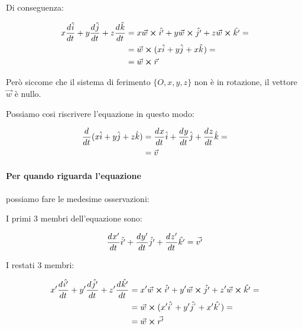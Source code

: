 Di conseguenza:

\begin{equation}
  \begin{split}
    x\der{\uvec{i}}{t} + y\der{\uvec{j}}{t} + z\der{\uvec{k}}{t}
    & = x \vec{w} \crossproduct \uvec{i'} +
    y \vec{w} \crossproduct \uvec{j'} +
    z \vec{w} \crossproduct \uvec{k'} =              \\
    & = \vec{w} \crossproduct (\veccomp{x}{y}{x}) = \\
    & = \vec{w} \crossproduct \vec{r}
  \end{split}
\end{equation}

Però siccome che il sistema di ferimento $\{ O,x,y,z\}$ non è in rotazione, il vettore
$\vec{w}$ è nullo.

Possiamo cosi riscrivere l'equazione  in questo modo:

\begin{equation}
  \begin{split}
    \frac{d^{} }{d t^{}} (x\hat{i} + y\hat{j} + z\hat{k})
    &= \frac{d^{} x}{d t^{}}\hat{i} + \frac{d^{} y}{d t^{}}\hat{j} +  \frac{d^{} z}{d t^{}}\hat{k} = \\
    &= \vec{v}
  \end{split}
\end{equation}

\paragraph{Per quando riguarda l'equazione }

possiamo fare le medesime osservazioni:

I primi 3 membri dell'equazione sono:

\begin{align}
  \frac{d^{} x'}{d t^{}}\hat{i'} + \frac{d^{} y'}{d t^{}}\hat{j'} + \frac{d^{} z'}{d t^{}}\hat{k'} = \vec{v'}
\end{align}

I restati 3 membri:

\begin{equation}
  \begin{split}
    x'\der{\uvec{i'}}{t} + y'\der{\uvec{j'}}{t} + z'\der{\uvec{k'}}{t}
    & = x' \vec{w} \crossproduct \uvec{i'} +
    y' \vec{w} \crossproduct \uvec{j'} +
    z '\vec{w} \crossproduct \uvec{k'} =              \\
    & = \vec{w} \crossproduct (\veccomp[']{x'}{y'}{x'}) = \\
    & = \vec{w} \crossproduct \vec{r'}
  \end{split}
\end{equation}

